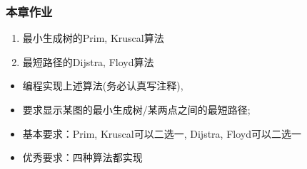 \begin{frame}[fragile]
  \frametitle{本章作业}
  \begin{enumerate}
  \item 最小生成树的Prim, Kruscal算法
  \item 最短路径的Dijstra, Floyd算法
  \end{enumerate}

  \begin{itemize}
  \item 编程实现上述算法(务必认真写注释),
  \item 要求显示某图的最小生成树/某两点之间的最短路径;
  \item 基本要求：Prim, Kruscal可以二选一, Dijstra, Floyd可以二选一
  \item 优秀要求：四种算法都实现
  \end{itemize}
\end{frame}